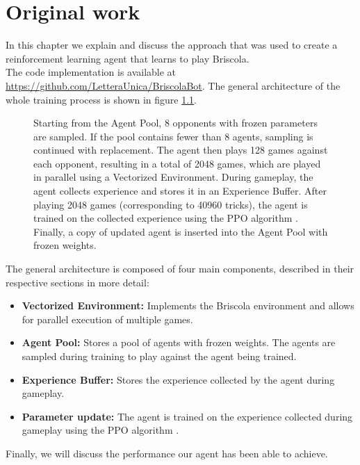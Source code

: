 \chapter{Original work}

In this chapter we explain and discuss the approach that was used to create a reinforcement learning agent that learns to play Briscola.\\
The code implementation is available at \url{https://github.com/LetteraUnica/BriscolaBot}.
The general architecture of the whole training process is shown in figure \ref{fig:general-architecture}.

\begin{figure}[H]
    \centering
    
    \caption{Starting from the Agent Pool, 8 opponents with frozen parameters are sampled. If the pool contains fewer than 8 agents, sampling is continued with replacement. The agent then plays 128 games against each opponent, resulting in a total of 2048 games, which are played in parallel using a Vectorized Environment. During gameplay, the agent collects experience and stores it in an Experience Buffer. After playing 2048 games (corresponding to 40960 tricks), the agent is trained on the collected experience using the PPO algorithm \cite{schulman2017proximal}. Finally, a copy of updated agent is inserted into the Agent Pool with frozen weights.}
    \label{fig:general-architecture}
\end{figure}
The general architecture is composed of four main components, described in their respective sections in more detail:
\begin{itemize}
    \item \textbf{Vectorized Environment:} Implements the Briscola environment and allows for parallel execution of multiple games.
    \item \textbf{Agent Pool:} Stores a pool of agents with frozen weights. The agents are sampled during training to play against the agent being trained.
    \item \textbf{Experience Buffer:} Stores the experience collected by the agent during gameplay.
    \item \textbf{Parameter update:} The agent is trained on the experience collected during gameplay using the PPO algorithm \cite{schulman2017proximal}.
\end{itemize}

Finally, we will discuss the performance our agent has been able to achieve.

